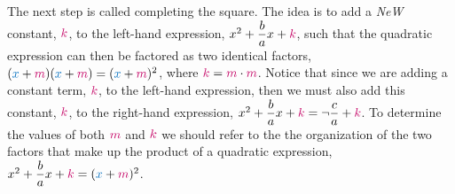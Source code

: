 \documentclass[20150903-160354-rs2.2-MarksMathNotebook.tex]{subfiles}
\begin{document}
The next step is called completing the square.  The idea is to add a \textit{NeW} constant, $\color{sthlmRed}k$, to the left-hand expression, $x^2 +\dfrac{b}{a}x+\color{sthlmRed}k$,  such that the quadratic expression can then be factored as two identical factors, $({\color{sthlmBlue}x}+{\color{sthlmRed}m})({\color{sthlmBlue}x}+{\color{sthlmRed}m}) = ({\color{sthlmBlue}x}+{\color{sthlmRed}m})^2$, where  ${{\color{sthlmRed}k}=\color{sthlmRed}m} \cdot {\color{sthlmRed}m}$.  Notice that since we are adding a constant term, $\color{sthlmRed}k$, to the left-hand expression, then we must also add this constant, ${\color{sthlmRed}k}$, to the right-hand expression, $x^2 +\dfrac{b}{a}x+{\color{sthlmRed}k} = \neg \dfrac{c}{a}+{\color{sthlmRed}k}$.  To determine the values of both ${\color{sthlmRed}m}$ and ${\color{sthlmRed}k}$ we should refer to the the organization of the two factors that make up the product of a quadratic expression, $x^2 +\dfrac{b}{a}x+{\color{sthlmRed}k}= ({\color{sthlmBlue}x}+{\color{sthlmRed}m})^2$.\\


\end{document}

